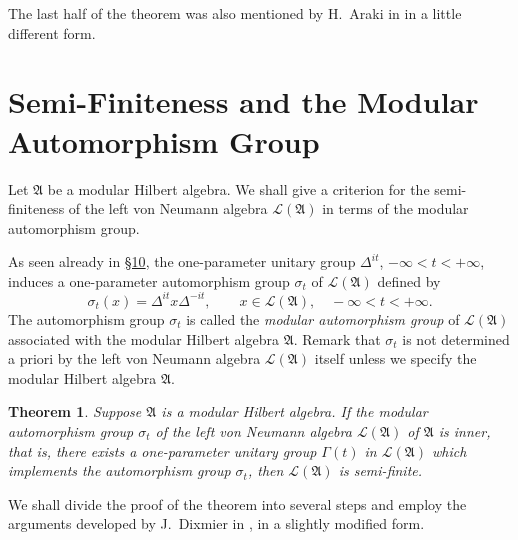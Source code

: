 \documentclass[12pt,b5paper,twoside]{article}
\theoremstyle{takesaki}
\newtheorem{theorem}{Theorem}[section]
\numberwithin{equation}{section}
\begin{document}
The last half of the theorem was also mentioned by H.~Araki in
\cite{ref1} in a little different form.

\section{Semi-Finiteness and the Modular Automorphism Group}
\label{sec:14}

Let $\mathfrak A$ be a modular Hilbert algebra.  We shall give a
criterion for the semi-finiteness of the left von Neumann algebra
$\mathcal L(\mathfrak A)$ in terms of the modular automorphism group.

As seen already in \hyperref[sec:10]{\S10}, the one-parameter unitary
group $\Delta^{it}$, $-\infty<t<+\infty$, induces a one-parameter
automorphism group $\sigma_t$ of $\mathcal L(\mathfrak A)$ defined by
\begin{equation}
  \sigma_t(x)=\Delta^{it}x\Delta^{-it},
  \qquad x\in\mathcal L(\mathfrak A),\quad -\infty<t<+\infty.
  \tag{14.1}\label{eq:14.1}
\end{equation}
The automorphism group $\sigma_t$ is called the \emph{modular
automorphism group} of $\mathcal L(\mathfrak A)$ associated with the
modular Hilbert algebra $\mathfrak A$.  Remark that $\sigma_t$ is not
determined a priori by the left von Neumann algebra
$\mathcal L(\mathfrak A)$ itself unless we specify the modular Hilbert
algebra $\mathfrak A$.

\begin{theorem}\label{thm:14.1}
Suppose $\mathfrak A$ is a modular Hilbert algebra.  If the modular
automorphism group $\sigma_t$ of the left von Neumann algebra
$\mathcal L(\mathfrak A)$ of $\mathfrak A$ is inner, that is, there
exists a one-parameter unitary group $\Gamma(t)$ in
$\mathcal L(\mathfrak A)$ which implements the automorphism group
$\sigma_t$, then $\mathcal L(\mathfrak A)$ is semi-finite.
\end{theorem}

We shall divide the proof of the theorem into several steps and employ
the arguments developed by J.~Dixmier in \cite[p.~287--292]{ref4,ref5},
in a slightly modified form.
\end{document}
